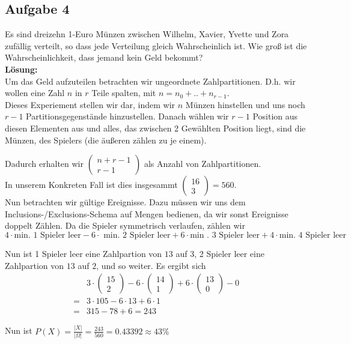 \documentclass[11pt,a4paper,ngerman]{article}
\begin{document}
\subsection*{Aufgabe 4}

Es sind dreizehn 1-Euro Münzen zwischen Wilhelm, Xavier, Yvette und Zora zufällig verteilt, so dass jede Verteilung gleich Wahrscheinlich ist.
Wie groß ist die Wahrscheinlichkeit, dass jemand kein Geld bekommt?\\

\textbf{Lösung:}\\

Um das Geld aufzuteilen betrachten wir ungeordnete Zahlpartitionen. D.h. wir wollen eine Zahl $n$ in $r$ Teile spalten, mit $n = n_0 + .. + n_{r-1}$.\\

Dieses Experiement stellen wir dar, indem wir $n$ Münzen hinstellen und uns noch $r-1$ Partitionsgegenstände hinzustellen. Danach wählen wir $r-1$ Position
aus diesen Elementen aus und alles, das zwischen 2 Gewählten Position liegt, sind die Münzen, des Spielers (die äußeren zählen zu je einem).

Dadurch erhalten wir $\left( \begin{array}{cc} n + r - 1 \\ r - 1\end{array}\right)$ als Anzahl von Zahlpartitionen.\\ In unserem Konkreten Fall ist dies
insgesammt $\begin{pmatrix} 16 \\ 3 \end{pmatrix} = 560$.\\

Nun betrachten wir gültige Ereignisse. Dazu müssen wir uns dem Inclusions-/Exclusions-Schema auf Mengen bedienen, da wir sonst Ereignisse doppelt Zählen.
Da die Spieler symmetrisch verlaufen, zählen wir
\[
    4 \cdot \text{min. 1 Spieler leer} - 6 \cdot \text{ min. 2 Spieler leer} + 6 \cdot \text{min . 3 Spieler leer} + 4 \cdot \text{min. 4 Spieler leer}
\]

Nun ist 1 Spieler leer eine Zahlpartion von $13$ auf $3$, 2 Spieler leer eine Zahlpartion von $13$ auf $2$, und so weiter. Es ergibt sich
\[\begin{array}{ll}
    &3 \cdot \begin{pmatrix} 15 \\ 2\end{pmatrix} - 6 \cdot \begin{pmatrix} 14 \\ 1 \end{pmatrix} + 6 \cdot \begin{pmatrix} 13 \\ 0 \end{pmatrix} - 0\\
    = & 3 \cdot 105 - 6 \cdot 13 + 6 \cdot 1\\
    = & 315 - 78 + 6 = 243
\end{array}\]

Nun ist $P(X) = \frac{|X|}{|\Omega|} = \frac{243}{560} = 0.43392 \approx 43 \%$


\label{LastPage}
\end{document}
